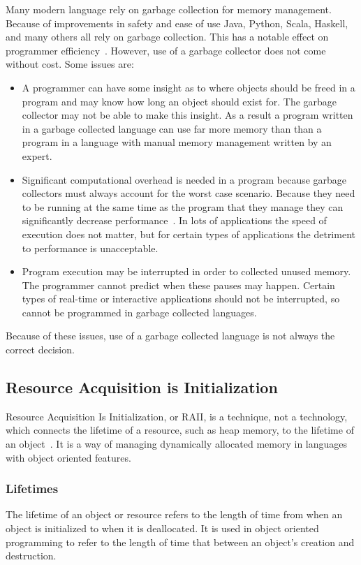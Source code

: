 Many modern language rely on garbage collection for memory management. Because
of improvements in safety and ease of use Java, Python, Scala, Haskell, and
many others all rely on garbage collection. This has a notable effect on
programmer efficiency~\cite{garbage}. However, use of a garbage collector does
not come without cost. Some issues are:

\begin{itemize}
    \item
        A programmer can have some insight as to where objects should be freed
        in a program and may know how long an object should exist for. The
        garbage collector may not be able to make this insight. As a result a
        program written in a garbage collected language can use far more memory
        than than a program in a language with manual memory management written
        by an expert.
    \item
        Significant computational overhead is needed in a program because
        garbage collectors must always account for the worst case scenario.
        Because they need to be running at the same time as the program that
        they manage they can significantly decrease performance~\cite{garbage}.
        In lots of applications the speed of execution does not matter, but for
        certain types of applications the detriment to performance is
        unacceptable.
    \item
        Program execution may be interrupted in order to collected unused
        memory. The programmer cannot predict when these pauses may happen.
        Certain types of real-time or interactive applications should not be
        interrupted, so cannot be programmed in garbage collected languages.
\end{itemize}

Because of these issues, use of a garbage collected language is not always the
correct decision.

\subsection{Resource Acquisition is Initialization}\label{sec:raii}
Resource Acquisition Is Initialization, or RAII, is a technique, not a
technology, which connects the lifetime of a resource, such as heap memory, to
the lifetime of an object~\cite{cppref}. It is a way of managing dynamically
allocated memory in languages with object oriented features.

\subsubsection{Lifetimes}
The lifetime of an object or resource refers to the length of time from when an
object is initialized to when it is deallocated. It is used in object oriented
programming to refer to the length of time that between an object's creation
and destruction. 

